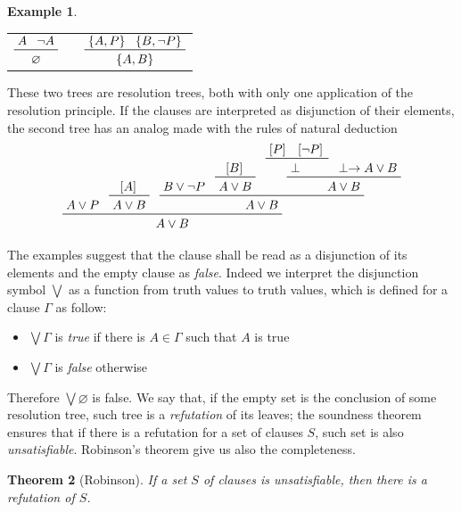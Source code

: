 \documentclass[a4paper,12pt,oneside]{book}
\newtheorem{theorem}{Theorem}[chapter]
\newtheorem{example}[theorem]{Example}
\let\emptyset\varnothing
\let\o\vee
\let\e\wedge
\let\bottom\perp
\begin{document}
\newpage\noindent\begin{example}
\end{example}
\begin{center}
\begin{tabular}{ccc}
$\prftree{A}{\neg A}{\emptyset}$& \hspace{4cm}&
$\prftree{\{A,P \}}{\{B, \neg P \}}{\{A,B \}}$
\end{tabular}
\end{center}
These two trees are resolution trees, both with only one application of the resolution principle. If the clauses are interpreted as disjunction of their elements, the second tree has an analog made with the rules of natural deduction 
\begin{equation*}
\prftree{\prfassumption{A\o P}}
{\prftree{\prfboundedassumption{A} }{A\o B}}
{\prftree{\prfassumption{B\o\neg P} }{\prftree{\prfboundedassumption{B} }{A\o B}}
 { \prftree{ \prftree{\prfboundedassumption{P}}{\prfboundedassumption{\neg P}}{\bottom}}{\prfassumption{ \bottom\rightarrow A\o B }}{A\o B} } 
{ A\o B} }
{A\o B}
\end{equation*}


The examples suggest that the clause shall be read as a disjunction of its elements and the empty clause as \textit{false}. Indeed we interpret the disjunction symbol $\bigvee$ as a function from truth values to truth values, which is defined for a clause $\Gamma$ as follow:
\begin{itemize}
\item $\bigvee \Gamma$ is  \textit{true} if there is $A\in\Gamma$ such that $A$ is true
\item  $\bigvee \Gamma$ is \textit{false} otherwise
\end{itemize}
Therefore $\bigvee\emptyset$ is false. We say that, if the empty set is the conclusion of some resolution tree, such tree is a \textit{refutation} of its leaves; the soundness theorem ensures that if there is a refutation for a set of clauses $S$, such set is also \textit{unsatisfiable}. Robinson's theorem \cite{robinson} give us also the completeness.
\begin{theorem}[Robinson]\label{originalRob}
If a set $S$ of clauses is unsatisfiable, then there is a refutation of $S$.
\end{theorem}
\end{document}

